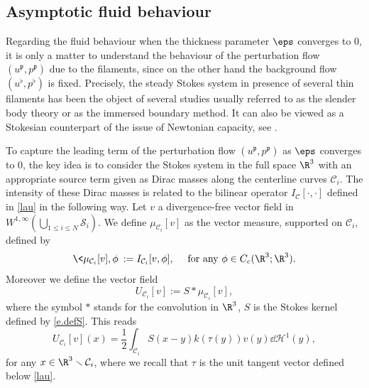 \subsection{Asymptotic fluid behaviour}
\label{sec-afb}

Regarding the fluid behaviour when the thickness parameter $\eps$ converges to $0$, it is only a matter to understand the behaviour of
the perturbation flow $(u^\mathfrak{p}, p^\mathfrak{p})$ due to the filaments, since on the other hand the background flow $(u^\flat,p^\flat) $ is fixed.
Precisely, the steady Stokes system in presence of several thin filaments has been the object of several studies usually referred to as the
slender body theory or as the immersed boundary method.
It can also be viewed as a Stokesian counterpart of the issue of Newtonian capacity, see \cite{FNN}.

To capture the leading term of the perturbation flow $(u^\mathfrak{p}, p^\mathfrak{p})$ as $\eps$ converges to $0$, the key idea is to consider
the Stokes system in the full space $\R^3$ with an appropriate source term given as Dirac masses along the centerline curves $\mathcal C_i$.
The intensity of these Dirac masses is related to the bilinear operator $I_{\mathcal C} [\cdot,\cdot]$ defined in \eqref{lau} in the following way.
Let $v$ a divergence-free vector field in $W^{1,\infty}(\bigcup_{1 \leq i \leq N} \mathcal S_i)$.
We define
$ \mu_{\mathcal C_i} [v]$ as the vector measure, supported on ${\mathcal{C}}_i$, defined by
\begin{equation} \label{def:mu(v)}
\< \mu_{\mathcal C_i} [v], \phi \> := I_{{\mathcal{C}}_i} [v,\phi], \quad \text{ for any } \phi \in C_c (\R^3 ; \R^3).
\end{equation}
Moreover we define the vector field
\begin{equation} \label{def:U}
U_{\mathcal C_i}[v]:= S \ast \mu_{\mathcal C_i} [v],
\end{equation}
where the symbol $\ast$ stands for the convolution in $\R^3$, $S$ is the Stokes kernel defined by \eqref{e.defS}.
This reads
\begin{equation} \label{eq:U.formal}
U_{\mathcal C_i}[v](x) = \frac12 \int_{\mathcal{C}_i} S(x -y) k(\tau(y)) v(y) \dd \mathcal{H}^1 (y),
\end{equation}
for any $x\in\R^3\smallsetminus\mathcal C_i$,
where we recall that $\tau$ is the unit tangent vector defined below \eqref{lau}.

